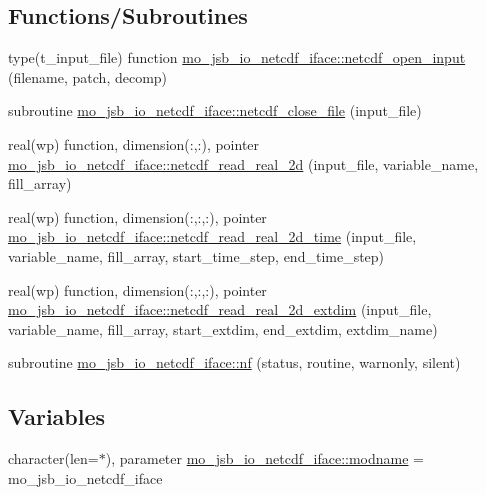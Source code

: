 \subsection*{Functions/\+Subroutines}
\begin{DoxyCompactItemize}
\item 
type(t\+\_\+input\+\_\+file) function \hyperlink{namespacemo__jsb__io__netcdf__iface_a62f76a91ba113d51746677418c103187}{mo\+\_\+jsb\+\_\+io\+\_\+netcdf\+\_\+iface\+::netcdf\+\_\+open\+\_\+input} (filename, patch, decomp)
\item 
subroutine \hyperlink{namespacemo__jsb__io__netcdf__iface_a1e42c90ce288ce4489b6e472daa40d2e}{mo\+\_\+jsb\+\_\+io\+\_\+netcdf\+\_\+iface\+::netcdf\+\_\+close\+\_\+file} (input\+\_\+file)
\item 
real(wp) function, dimension(\+:,\+:), pointer \hyperlink{namespacemo__jsb__io__netcdf__iface_a228681d1ececa8f44b717c01629fee9d}{mo\+\_\+jsb\+\_\+io\+\_\+netcdf\+\_\+iface\+::netcdf\+\_\+read\+\_\+real\+\_\+2d} (input\+\_\+file, variable\+\_\+name, fill\+\_\+array)
\item 
real(wp) function, dimension(\+:,\+:,\+:), pointer \hyperlink{namespacemo__jsb__io__netcdf__iface_a4e62dfd3cc23b3747e5039db1110a5a0}{mo\+\_\+jsb\+\_\+io\+\_\+netcdf\+\_\+iface\+::netcdf\+\_\+read\+\_\+real\+\_\+2d\+\_\+time} (input\+\_\+file, variable\+\_\+name, fill\+\_\+array, start\+\_\+time\+\_\+step, end\+\_\+time\+\_\+step)
\item 
real(wp) function, dimension(\+:,\+:,\+:), pointer \hyperlink{namespacemo__jsb__io__netcdf__iface_acc08a587eb91f00869119c81c06aea05}{mo\+\_\+jsb\+\_\+io\+\_\+netcdf\+\_\+iface\+::netcdf\+\_\+read\+\_\+real\+\_\+2d\+\_\+extdim} (input\+\_\+file, variable\+\_\+name, fill\+\_\+array, start\+\_\+extdim, end\+\_\+extdim, extdim\+\_\+name)
\item 
subroutine \hyperlink{namespacemo__jsb__io__netcdf__iface_a14c4e6dbfc96b953416a81add4b76022}{mo\+\_\+jsb\+\_\+io\+\_\+netcdf\+\_\+iface\+::nf} (status, routine, warnonly, silent)
\end{DoxyCompactItemize}
\subsection*{Variables}
\begin{DoxyCompactItemize}
\item 
character(len=$\ast$), parameter \hyperlink{namespacemo__jsb__io__netcdf__iface_aa929904f54cf60b8c7c6bc8be31257d0}{mo\+\_\+jsb\+\_\+io\+\_\+netcdf\+\_\+iface\+::modname} = \textquotesingle{}mo\+\_\+jsb\+\_\+io\+\_\+netcdf\+\_\+iface\textquotesingle{}
\end{DoxyCompactItemize}
